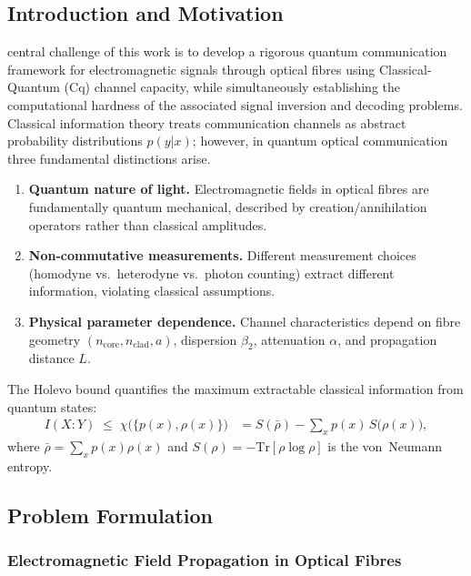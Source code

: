 \documentclass[journal,twocolumn]{IEEEtran}
\theoremstyle{definition}
\theoremstyle{plain}
\newcommand{\Tr}{\mathrm{Tr}}
\begin{document}
\subsection{Introduction and Motivation}

 central challenge of this work is to develop a
rigorous quantum communication framework for electromagnetic signals
through optical fibres using Classical-Quantum (Cq) channel capacity,
while simultaneously establishing the computational hardness of the
associated signal inversion and decoding problems. Classical information
theory treats communication channels as abstract probability
distributions $p(y|x)$; however, in quantum optical communication three
fundamental distinctions arise.

\begin{enumerate}[leftmargin=*, label=(\roman*), itemsep=2pt]
  \item \textbf{Quantum nature of light.} Electromagnetic fields in
    optical fibres are fundamentally quantum mechanical, described by
    creation/annihilation operators rather than classical amplitudes.
  \item \textbf{Non-commutative measurements.} Different measurement
    choices (homodyne vs.\ heterodyne vs.\ photon counting) extract
    different information, violating classical assumptions.
  \item \textbf{Physical parameter dependence.} Channel characteristics
    depend on fibre geometry $(n_{\mathrm{core}}, n_{\mathrm{clad}},a)$,
    dispersion $\beta_2$, attenuation $\alpha$, and propagation distance
    $L$.
\end{enumerate}

The Holevo bound \cite{holevo1973} quantifies the maximum extractable
classical information from quantum states:
\begin{align}
  I(X{:}Y) \;\le\; \chi\bigl(\{p(x),\rho(x)\}\bigr)
  &= S(\bar\rho) - \sum_x p(x)\,S\bigl(\rho(x)\bigr),
  \label{eq:holevo_bound}
\end{align}
where $\bar\rho = \sum_x p(x)\rho(x)$ and
$S(\rho)=-\Tr[\rho\log\rho]$ is the von~Neumann entropy.

\subsection{Problem Formulation}
\label{sec:week1_problem}

\subsubsection{Electromagnetic Field Propagation in Optical Fibres}
\end{document}
